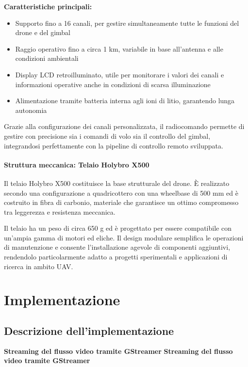\textbf{Caratteristiche principali:}
\begin{itemize}
    \item Supporto fino a 16 canali, per gestire simultaneamente tutte le funzioni del drone e del gimbal
    \item Raggio operativo fino a circa 1 km, variabile in base all’antenna e alle condizioni ambientali
    \item Display LCD retroilluminato, utile per monitorare i valori dei canali e informazioni operative anche in condizioni di scarsa illuminazione
    \item Alimentazione tramite batteria interna agli ioni di litio, garantendo lunga autonomia
\end{itemize}

Grazie alla configurazione dei canali personalizzata, il radiocomando permette di gestire con precisione sia i comandi di volo sia il controllo del gimbal, integrandosi perfettamente con la pipeline di controllo remoto sviluppata.

\subsubsection{ Struttura meccanica: Telaio Holybro X500}

Il telaio Holybro X500 costituisce la base strutturale del drone. È realizzato secondo una configurazione a quadricottero con una wheelbase di 500 mm ed è costruito in fibra di carbonio, materiale che garantisce un ottimo compromesso tra leggerezza e resistenza meccanica.

Il telaio ha un peso di circa 650 g ed è progettato per essere compatibile con un’ampia gamma di motori ed eliche. Il design modulare semplifica le operazioni di manutenzione e consente l’installazione agevole di componenti aggiuntivi, rendendolo particolarmente adatto a progetti sperimentali e applicazioni di ricerca in ambito UAV.



\chapter{Implementazione}
\label{cap:implementazione}
\newpage

\section{Descrizione dell'implementazione}
\bigskip
\noindent \textbf{Streaming del flusso video tramite GStreamer}
\bigskip
\noindent \textbf{Streaming del flusso video tramite GStreamer}
\bigskip

